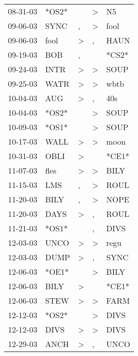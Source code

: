 \begin{supertabular}{lllll}
 08-31-03 &  *OS2* &                  &     \textgreater &     N5 \\
 09-06-03 &   SYNC &                , &     \textgreater &   fool \\
 09-06-03 &   fool &     \textgreater &                , &   HAUN \\
 09-19-03 &    BOB &                , &                  &  *CS2* \\
 09-24-03 &   INTR &     \textgreater &     \textgreater &   SOUP \\
 09-25-03 &   WATR &     \textgreater &     \textgreater &   wbtb \\
 10-04-03 &    AUG &     \textgreater &                , &    40s \\
 10-04-03 &  *OS2* &                  &     \textgreater &   SOUP \\
 10-09-03 &  *OS1* &                  &     \textgreater &   SOUP \\
 10-17-03 &   WALL &     \textgreater &     \textgreater &   moon \\
 10-31-03 &   OBLI &     \textgreater &                  &  *CE1* \\
 11-07-03 &   fles &     \textgreater &     \textgreater &   BILY \\
 11-15-03 &    LMS &                , &     \textgreater &   ROUL \\
 11-20-03 &   BILY &                , &     \textgreater &   NOPE \\
 11-20-03 &   DAYS &     \textgreater &                , &   ROUL \\
 11-21-03 &  *OS1* &                  &                , &   DIVS \\
 12-03-03 &   UNCO &     \textgreater &     \textgreater &   regu \\
 12-03-03 &   DUMP &     \textgreater &                , &   SYNC \\
 12-06-03 &  *OE1* &                  &     \textgreater &   BILY \\
 12-06-03 &   BILY &     \textgreater &                  &  *CE1* \\
 12-06-03 &   STEW &     \textgreater &     \textgreater &   FARM \\
 12-12-03 &  *OS2* &                  &     \textgreater &   DIVS \\
 12-12-03 &   DIVS &     \textgreater &     \textgreater &   DIVS \\
 12-29-03 &   ANCH &     \textgreater &                , &   UNCO \\

\end{supertabular}
